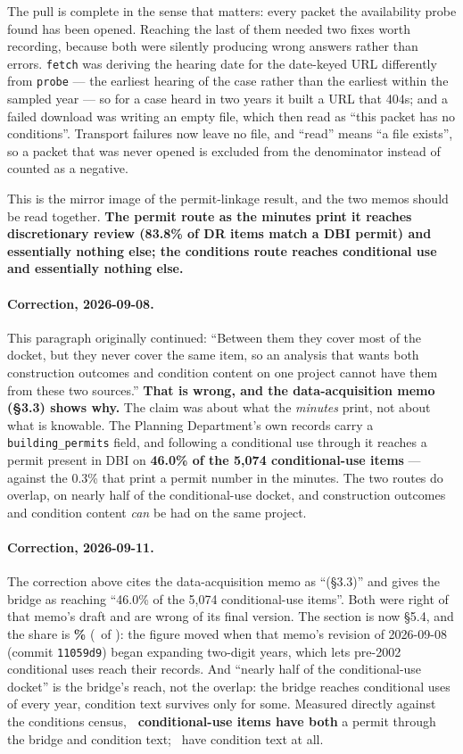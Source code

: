 \documentclass[11pt]{article}
\begin{document}
The pull is complete in the sense that matters: every packet the availability probe found has
been opened. Reaching the last of them needed two fixes worth recording, because both were
silently producing wrong answers rather than errors. \texttt{fetch} was deriving the hearing
date for the date-keyed URL differently from \texttt{probe} --- the earliest hearing of the
case rather than the earliest within the sampled year --- so for a case heard in two years it
built a URL that 404s; and a failed download was writing an empty file, which then read as
``this packet has no conditions''. Transport failures now leave no file, and ``read'' means
``a file exists'', so a packet that was never opened is excluded from the denominator instead
of counted as a negative.

This is the mirror image of the permit-linkage result, and the two memos should be read
together. \textbf{The permit route as the minutes print it reaches discretionary review
(83.8\% of DR items match a DBI permit) and essentially nothing else; the conditions route
reaches conditional use and essentially nothing else.}

\paragraph{Correction, 2026-09-08.} This paragraph originally continued: ``Between them they
cover most of the docket, but they never cover the same item, so an analysis that wants both
construction outcomes and condition content on one project cannot have them from these two
sources.'' \textbf{That is wrong, and the data-acquisition memo (\S3.3) shows why.} The claim
was about what the \emph{minutes} print, not about what is knowable. The Planning
Department's own records carry a \texttt{building\_permits} field, and following a conditional
use through it reaches a permit present in DBI on \textbf{46.0\% of the 5{,}074
conditional-use items} --- against the 0.3\% that print a permit number in the minutes. The
two routes do overlap, on nearly half of the conditional-use docket, and construction outcomes
and condition content \emph{can} be had on the same project.

\paragraph{Correction, 2026-09-11.} The correction above cites the data-acquisition memo as
``(\S3.3)'' and gives the bridge as reaching ``46.0\% of the 5{,}074 conditional-use items''.
Both were right of that memo's draft and are wrong of its final version. The section is now
\S5.4, and the share is \textbf{\condBridgeCUPct\%} (\condBridgeCUItems\ of \condCUItems):
the figure moved when that memo's revision of 2026-09-08 (commit \texttt{11059d9}) began
expanding two-digit years, which lets pre-2002 conditional uses reach their records. And
``nearly half of the conditional-use docket'' is the bridge's reach, not the overlap: the
bridge reaches conditional uses of every year, condition text survives only for some. Measured
directly against the conditions census, \textbf{\condOverlapCU\ conditional-use items have both}
a permit through the bridge and condition text; \condCondTextCU\ have condition text at all.
\end{document}
